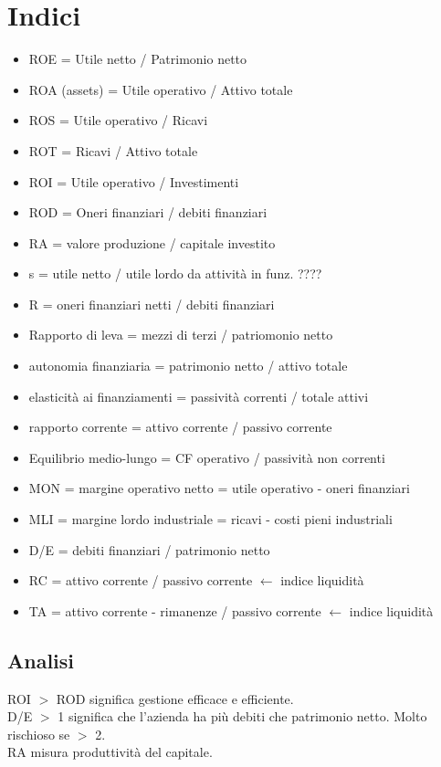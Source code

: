 \documentclass{scrreprt}
\begin{document}
\section*{Indici}
\begin{itemize}
	\item ROE = Utile netto / Patrimonio netto
	\item ROA (assets) = Utile operativo / Attivo totale
	\item ROS = Utile operativo / Ricavi
	\item ROT = Ricavi / Attivo totale
	\item ROI = Utile operativo / Investimenti
	\item ROD = Oneri finanziari / debiti finanziari
	\item RA = valore produzione / capitale investito
	\item s = utile netto / utile lordo da attività in funz. ????
	\item R = oneri finanziari netti / debiti finanziari
	\item Rapporto di leva = mezzi di terzi / patriomonio netto
	\item autonomia finanziaria = patrimonio netto / attivo totale
	\item elasticità ai finanziamenti = passività correnti / totale attivi
	\item rapporto corrente = attivo corrente / passivo corrente
	\item Equilibrio medio-lungo = CF operativo / passività non correnti
	\item MON = margine operativo netto = utile operativo - oneri finanziari
	\item MLI = margine lordo industriale = ricavi - costi pieni industriali
	\item D/E = debiti finanziari / patrimonio netto
	\item RC = attivo corrente / passivo corrente $\leftarrow$ indice liquidità
	\item TA = attivo corrente - rimanenze / passivo corrente $\leftarrow$ indice liquidità
\end{itemize}

\subsection*{Analisi}
ROI $>$ ROD significa gestione efficace e efficiente.\\
D/E $>$ 1 significa che l'azienda ha più debiti che patrimonio netto. Molto rischioso se $>$ 2.\\
RA misura produttività del capitale.\\
\end{document}
